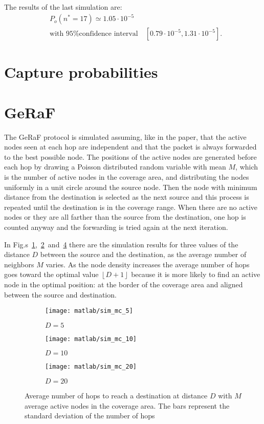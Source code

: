 \documentclass[a4paper,oneside]{article}
\renewcommand{\approx}[0]{\simeq}
\newcommand{\floor}[1]{\left\lfloor#1\right\rfloor}
\begin{document}
The results of the last simulation are:
\begin{align*}
  & P_o(n^* = 17) \approx 1.05 \cdot 10^{-5} \\
  & \text{with 95\% confidence interval} \quad [0.79 \cdot 10^{-5}, 1.31 \cdot 10^{-5}] .
\end{align*}
\section{Capture probabilities}
\section{GeRaF}
The GeRaF protocol is simulated assuming, like in the paper, that the
active nodes seen at each hop are independent and that the packet is
always forwarded to the best possible node.
%
The positions of the active nodes are generated before each hop by
drawing a Poisson distributed random variable with mean $M$, which is
the number of active nodes in the coverage area, and distributing the
nodes uniformly in a unit circle around the source node.
%
Then the node with minimum distance from the destination is selected
as the next source and this process is repeated until the destination
is in the coverage range.
%
When there are no active nodes or they are all farther than the source
from the destination, one hop is counted anyway and the forwarding is
tried again at the next iteration.

In
Fig.s~\ref{plot:geraf_sim_5},~\ref{plot:geraf_sim_10}~and~\ref{plot:geraf_sim_20}
there are the simulation results for three values of the distance $D$
between the source and the destination, as the average number of
neighbors $M$ varies. As the node density increases the average number
of hops goes toward the optimal value $\floor{D+1}$ because it is more
likely to find an active node in the optimal position: at the border
of the coverage area and aligned between the source and destination.
\begin{figure}[htbp]
  \centering
  \begin{subfigure}{0.5\textwidth}
    \centering
    \texttt{[image: matlab/sim\_mc\_5]}
    \caption{$ D = 5 $}
    \label{plot:geraf_sim_5}
  \end{subfigure}%
  \begin{subfigure}{0.5\textwidth}
    \centering
    \texttt{[image: matlab/sim\_mc\_10]}
    \caption{$ D = 10 $}
    \label{plot:geraf_sim_10}
  \end{subfigure}
  \begin{subfigure}{0.5\textwidth}
    \centering
    \texttt{[image: matlab/sim\_mc\_20]}
    \caption{$ D = 20 $}
    \label{plot:geraf_sim_20}
  \end{subfigure}
  \caption{Average number of hops to reach a destination at distance
    $D$ with $M$ average active nodes in the coverage area. The bars
    represent the standard deviation of the number of hops}
\end{figure}
\end{document}
